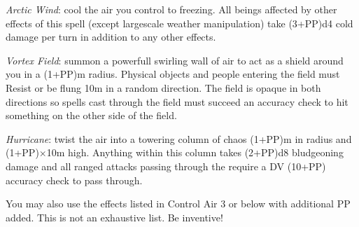 \begin{multicols}{3}
{\begin{spellitemize}
\item {\it Arctic Wind}: cool the air you control to freezing. All beings affected by other effects of this spell (except large\minus{}scale weather manipulation) take (3+PP)d4 cold damage per turn in addition to any other effects. 
\item {\it Vortex Field}: summon a powerfull\comma{} swirling wall of air to act as a shield around you in a (1+PP)m radius. Physical objects and people entering the  field must Resist\comma{} or be flung 10m in a random direction. The field is opaque in both directions\comma{} so spells cast through the field must succeed an accuracy check to hit something on the other side of the field. 
\item {\it Hurricane}: twist the air into a towering column of chaos (1+PP)m in radius and (1+PP)$\times$10m high. Anything within this column takes (2+PP)d8 bludgeoning damage\comma{} and all ranged attacks passing through the require a DV (10+PP) accuracy check to pass through. 
\end{spellitemize}
You may also use the effects listed in Control Air 3 or below with \PPDifference{\DVExpF}{\DVAdpF} additional PP added. 
This is not an exhaustive list. Be inventive!}
\end{multicols}
